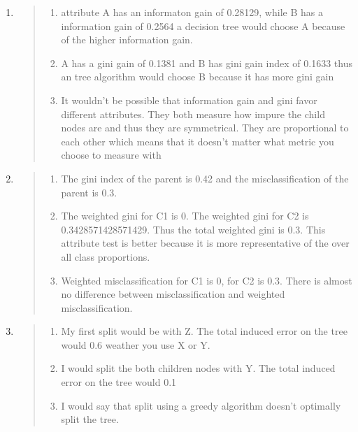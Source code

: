 \documentclass[11pt]{article}
\providecommand{\tightlist}{%
      \setlength{\itemsep}{0pt}\setlength{\parskip}{0pt}}
\begin{document}
\begin{enumerate}
\def\labelenumi{\arabic{enumi}.}
\setcounter{enumi}{4}
\item
  \begin{quote}
  \begin{enumerate}
  \def\labelenumii{\alph{enumii}.}
  \tightlist
  \item
    attribute A has an informaton gain of 0.28129, while B has a
    information gain of 0.2564 a decision tree would choose A because of
    the higher information gain. 
  \item
    A has a gini gain of 0.1381 and B has gini gain index of 0.1633 thus
    an tree algorithm would choose B because it has more gini gain 
  \item
    It wouldn't be possible that information gain and gini favor
    different attributes. They both measure how impure the child nodes
    are and thus they are symmetrical. They are proportional to each
    other which means that it doesn't matter what metric you choose to
    measure with 
  \end{enumerate}
  \end{quote}
\item
  \begin{quote}
  \begin{enumerate}
  \def\labelenumii{\alph{enumii}.}
  \tightlist
  \item
    The gini index of the parent is 0.42 and the misclassification of
    the parent is 0.3.
  \item
    The weighted gini for C1 is 0. The weighted gini for C2 is
    0.3428571428571429. Thus the total weighted gini is 0.3. This
    attribute test is better because it is more representative of the
    over all class proportions. 
  \item
    Weighted misclassification for C1 is 0, for C2 is 0.3. There is
    almost no difference between misclassification and weighted
    misclassification. 
  \end{enumerate}
  \end{quote}
\item
  \begin{quote}
  \begin{enumerate}
  \def\labelenumii{\alph{enumii}.}
  \tightlist
  \item
    My first split would be with Z. The total induced error on the tree
    would 0.6 weather you use X or Y.
  \item
    I would split the both children nodes with Y. The total induced
    error on the tree would 0.1 
  \item
    I would say that split using a greedy algorithm doesn't optimally
    split the tree.
  \end{enumerate}
  \end{quote}
\end{enumerate}
\end{document}

